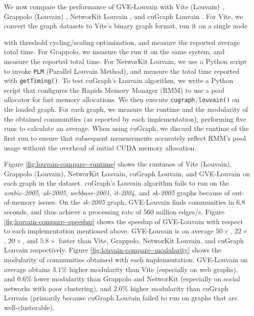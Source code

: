 We now compare the performance of GVE-Louvain with Vite (Louvain) \cite{ghosh2018scalable}, Grappolo (Louvain) \cite{com-halappanavar17}, NetworKit Louvain \cite{staudt2016networkit}, and cuGraph Louvain \cite{kang2023cugraph}. For Vite, we convert the graph datasets to Vite's binary graph format, run it on a single node with threshold cycling/scaling optimization, and measure the reported average total time. For Grappolo, we measure the run it on the same system, and measure the reported total time. For NetworKit Louvain, we use a Python script to invoke \texttt{PLM} (Parallel Louvain Method), and measure the total time reported with \texttt{getTiming()}. To test cuGraph's Louvain algorithm, we write a Python script that configures the Rapids Memory Manager (RMM) to use a pool allocator for fast memory allocations. We then execute \texttt{cugraph.louvain()} on the loaded graph. For each graph, we measure the runtime and the modularity of the obtained communities (as reported by each implementation), performing five runs to calculate an average. When using cuGraph, we discard the runtime of the first run to ensure that subsequent measurements accurately reflect RMM's pool usage without the overhead of initial CUDA memory allocation.

Figure \ref{fig:louvain-compare--runtime} shows the runtimes of Vite (Louvain), Grappolo (Louvain), NetworKit Louvain, cuGraph Louvain, and GVE-Louvain on each graph in the dataset. cuGraph's Louvain algorithm fails to run on the \textit{arabic-2005}, \textit{uk-2005}, \textit{webbase-2001}, \textit{it-2004}, and \textit{sk-2005} graphs because of out-of-memory issues. On the \textit{sk-2005} graph, GVE-Louvain finds communities in $6.8$ seconds, and thus achieve a processing rate of $560$ million edges/s. Figure \ref{fig:louvain-compare--speedup} shows the speedup of GVE-Louvain with respect to each implementation mentioned above. GVE-Louvain is on average $50\times$, $22\times$, $20\times$, and $5.8\times$ faster than Vite, Grappolo, NetworKit Louvain, and cuGraph Louvain respectively.  Figure \ref{fig:louvain-compare--modularity} shows the modularity of communities obtained with each implementation. GVE-Louvain on average obtains $3.1\%$ higher modularity than Vite (especially on web graphs), and $0.6\%$ lower modularity than Grappolo and NetworKit (especially on social networks with poor clustering), and $2.6\%$ higher modularity than cuGraph Louvain (primarily because cuGraph Louvain failed to run on graphs that are well-clusterable).

